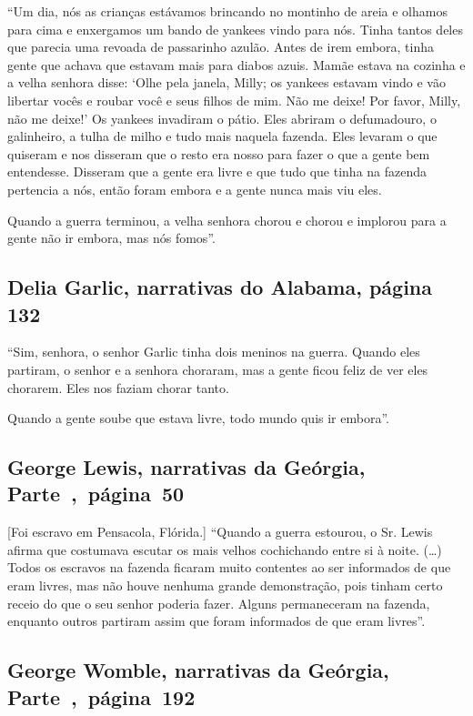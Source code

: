 ``Um dia, nós as crianças estávamos brincando no montinho de areia e
olhamos para cima e enxergamos um bando de yankees vindo para nós. Tinha
tantos deles que parecia uma revoada de passarinho azulão. Antes de irem
embora, tinha gente que achava que estavam mais para diabos azuis. Mamãe
estava na cozinha e a velha senhora disse: `Olhe pela janela, Milly; os
yankees estavam vindo e vão libertar vocês e roubar você e seus filhos
de mim. Não me deixe! Por favor, Milly, não me deixe!' Os yankees
invadiram o pátio. Eles abriram o defumadouro, o galinheiro, a tulha de
milho e tudo mais naquela fazenda. Eles levaram o que quiseram e nos
disseram que o resto era nosso para fazer o que a gente bem entendesse.
Disseram que a gente era livre e que tudo que tinha na fazenda pertencia
a nós, então foram embora e a gente nunca mais viu eles.

Quando a guerra terminou, a velha senhora chorou e chorou e implorou
para a gente não ir embora, mas nós fomos''.

\subsection{Delia Garlic, narrativas do Alabama, página 132} \label{ref101}

``Sim, senhora, o senhor Garlic tinha dois meninos na guerra. Quando
eles partiram, o senhor e a senhora choraram, mas a gente ficou feliz de
ver eles chorarem. Eles nos faziam chorar tanto.

Quando a gente soube que estava livre, todo mundo quis ir embora''.

\subsection{George Lewis, narrativas da Geórgia, Parte~,~página~50}
\label{ref175}

{[}Foi escravo em Pensacola, Flórida.{]} ``Quando a guerra estourou, o Sr. Lewis afirma que costumava escutar os
mais velhos cochichando entre si à noite. (\ldots{}) Todos os escravos
na fazenda ficaram muito contentes ao ser informados de que eram livres,
mas não houve nenhuma grande demonstração, pois tinham certo receio do
que o seu senhor poderia fazer. Alguns permaneceram na fazenda, enquanto
outros partiram assim que foram informados de que eram livres''.

\subsection{George Womble, narrativas da Geórgia, Parte~,~página~192}
\label{ref312}

